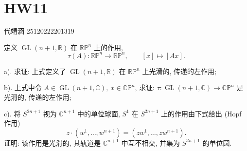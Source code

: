 \documentclass[../main.tex]{subfiles}
\begin{document}
\ifSubfilesClassLoaded{

    
    \setcounter{chapter}{10}
}{}

\chapter{ HW11 }
代靖涵 25120222201319
\begin{exercise}{}{}
定义 \(\operatorname{GL}(n+1,\mathbb{R})\) 在 \(\mathbb{RP}^n\) 上的作用,
\[
\tau(A):\mathbb{RP}^n\to \mathbb{RP}^n,\qquad [x]\mapsto [Ax].
\]

a). 求证: 上式定义了 \(\operatorname{GL}(n+1,\mathbb{R})\) 在 \(\mathbb{RP}^n\) 上光滑的, 传递的左作用;

b). 上式中令 \(A\in \operatorname{GL}(n+1,\mathbb{C}),\ x\in \mathbb{CP}^n\), 求证:
\(\tau:\operatorname{GL}(n+1,\mathbb{C})\to \mathbb{CP}^n\) 是光滑的, 传递的左作用;

c). 将 \(S^{2n+1}\) 视为 \(\mathbb{C}^{n+1}\) 中的单位球面, \(S^1\) 在 \(S^{2n+1}\) 上的作用由下式给出 (Hopf 作用)
\[
z\cdot (w^1,\dots,w^{n+1})=(zw^1,\dots,zw^{n+1}).
\]
证明: 该作用是光滑的, 其轨道是 \(\mathbb{C}^{n+1}\) 中互不相交, 并集为 \(S^{2n+1}\) 的单位圆.


\end{exercise}
\end{document}
